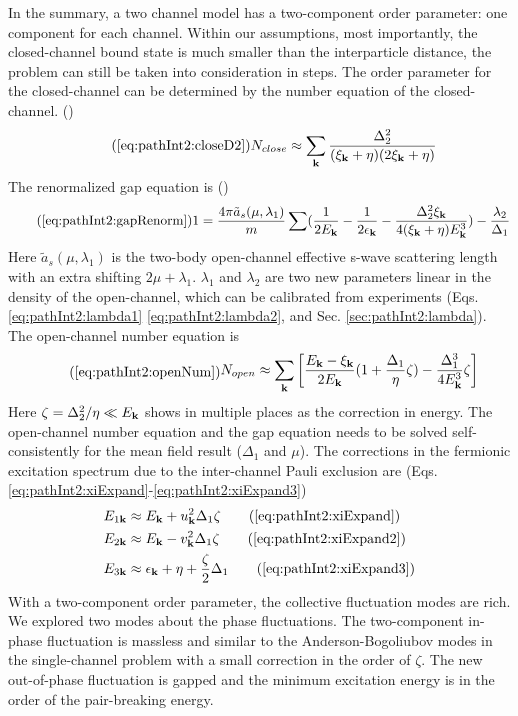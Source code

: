        In the summary, a two channel model has a two-component order parameter: one component for each channel.  Within our assumptions, most importantly, the closed-channel bound state is much smaller than the interparticle distance, the problem can still be taken into consideration in steps.  The order parameter for the closed-channel can be determined by the number equation of the closed-channel. ()
\begin{equation}\tag{\ref{eq:pathInt2:closeD2}}
N_{close}\approx\sum_{\vk}\frac{\Delta_{2}^2}{(\xi_{\vk}+\eta)(2\xi_{\vk}+\eta)}
\end{equation}
 The renormalized gap equation is ()
 \begin{equation}\tag{\ref{eq:pathInt2:gapRenorm}}
1=\frac{4\pi{\tilde{a}_{s}(\mu,\lambda_{1})}}{m}\sum(\nth{2E_{\vk}}-\nth{2\epsilon_{\vk}}-\frac{\Delta_{2}^{2}\xi_{\vk}}{4(\xi_{\vk}+\eta){E_{\vk}^{3}}})
	-\frac{\lambda_{2}}{\Delta_{1}}
\end{equation}
Here $\tilde{a}_{s}(\mu,\lambda_{1})$ is the two-body open-channel effective  s-wave scattering length with  an extra shifting $2\mu+\lambda_{1}$.   $\lambda_{1}$ and $\lambda_{2}$ are two new parameters linear in the density of the open-channel, which can be calibrated from  experiments (Eqs. \ref{eq:pathInt2:lambda1} \ref{eq:pathInt2:lambda2}, and Sec. \ref{sec:pathInt2:lambda}).  The open-channel number equation is 
\begin{equation}\tag{\ref{eq:pathInt2:openNum}}
\begin{split}
N_{open}\approx\sum_\vk\mbr{\frac{E_\vk-\xi_\vk}{2E_\vk}(1+\frac{\Delta_{1}}{\eta}\zeta)-\frac{\Delta_{1}^{3}}{4E_\vk^{3}}\zeta
	}	
\end{split}
\end{equation}
Here $\zeta=\Delta_{2}^{2}/\eta\ll{}E_{\mathbf{k}}$ shows in multiple places as the correction in energy.  The open-channel number equation and the gap equation needs to be solved self-consistently for the mean field result ($\Delta_{1}$ and $\mu$).  The corrections in the fermionic excitation spectrum due to the inter-channel Pauli exclusion are (Eqs. \ref{eq:pathInt2:xiExpand}-\ref{eq:pathInt2:xiExpand3})
\begin{align}
E_{1\vk}&\approx{}E_{\vk}+u_{\vk}^{2}\Delta_{1}\zeta\tag{\ref{eq:pathInt2:xiExpand}}\\
E_{2\vk}&\approx{}E_{\vk}-v_{\vk}^{2}\Delta_{1}\zeta\tag{\ref{eq:pathInt2:xiExpand2}}\\
E_{3\vk}&\approx{}\epsilon_{\vk}+\eta+\frac{\zeta}{2}\Delta_{1}
\tag{\ref{eq:pathInt2:xiExpand3}}
\end{align}
With a two-component order parameter, the collective fluctuation modes are rich.  We explored two modes about the phase fluctuations.  The two-component in-phase fluctuation is massless and similar to the Anderson-Bogoliubov modes in the single-channel problem with a small correction in the order of $\zeta$.  The new out-of-phase fluctuation is gapped and the minimum excitation energy is in the order of the pair-breaking energy.  

